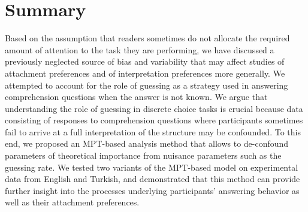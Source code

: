 \documentclass[11pt]{article}\usepackage[]{graphicx}\usepackage[]{color}
\begin{document}


\section{Summary}

Based on the assumption that readers sometimes do not allocate the required amount of attention to the task they are performing, we have discussed a previously neglected source of bias and variability that may affect studies of attachment preferences and of interpretation preferences more generally. We attempted to account for the role of guessing as a strategy used in answering comprehension questions when the answer is not known. We argue that understanding the role of guessing in discrete choice tasks is crucial because data consisting of responses to comprehension questions where participants sometimes fail to arrive at a full interpretation of the structure may be confounded. To this end, we proposed an MPT-based analysis method that allows to de-confound parameters of theoretical importance from nuisance parameters such as the guessing rate. We tested two variants of the MPT-based model on experimental data from English and Turkish, and demonstrated that this method can provide further insight into the processes underlying participants' answering behavior as well as their attachment preferences. 










\end{document}
